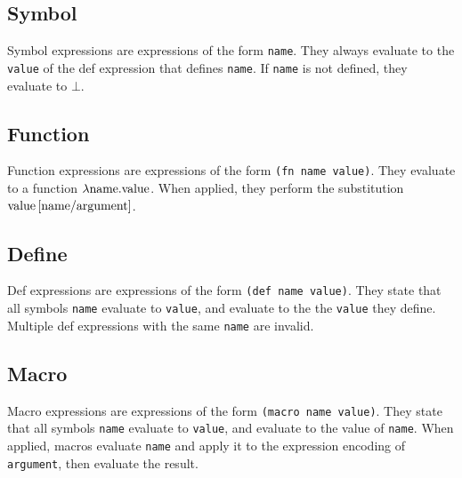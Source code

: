 \documentclass{article}
\begin{document}
    \begin{multicols}{2}
        \subsection{Symbol}\label{subsec:symbol}

        \begin{minipage}{\columnwidth}
            Symbol expressions are expressions of the form \lstinline$name$.
            They always evaluate to the \lstinline$value$ of the def expression that defines \lstinline$name$.
            If \lstinline$name$ is not defined, they evaluate to $\bot$.
        \end{minipage}

        \subsection{Function}\label{subsec:function}

        \begin{minipage}{\columnwidth}
            Function expressions are expressions of the form \lstinline$(fn name value)$.
            They evaluate to a function $\lambda\lstinline{name}.\lstinline{value}$.
            When applied, they perform the substitution $\lstinline{value}\left[\lstinline{name}/\lstinline{argument}\right]$.
        \end{minipage}

        \subsection{Define}\label{subsec:def}

        \begin{minipage}{\columnwidth}
            Def expressions are expressions of the form \lstinline$(def name value)$.
            They state that all symbols \lstinline$name$ evaluate to \lstinline$value$, and evaluate to the the \lstinline$value$ they define.
            Multiple def expressions with the same \lstinline$name$ are invalid.
        \end{minipage}

        \subsection{Macro}\label{subsec:macro}

        \begin{minipage}{\columnwidth}
            Macro expressions are expressions of the form \lstinline$(macro name value)$.
            They state that all symbols \lstinline$name$ evaluate to \lstinline$value$, and evaluate to the value of \lstinline$name$.
            When applied, macros evaluate \lstinline$name$ and apply it to the expression encoding of \lstinline$argument$, then evaluate the result.
        \end{minipage}


\end{multicols}
\end{document}
